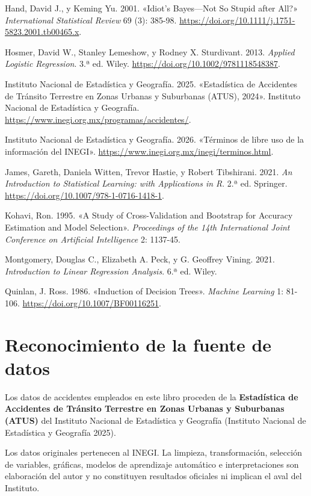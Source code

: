 \documentclass[
  spanish,
  10.5pt,
  letterpaper,
  openany,
  headings=big]{scrbook}
\newlength{\cslhangindent}
\newenvironment{CSLReferences}[2] %
 {\begin{list}{}{%
  \setlength{\itemindent}{0pt}
  \setlength{\leftmargin}{0pt}
  \setlength{\parsep}{0pt}
  \ifodd #1
   \setlength{\leftmargin}{\cslhangindent}
   \setlength{\itemindent}{-1\cslhangindent}
  \fi
  \setlength{\itemsep}{#2\baselineskip}}}
 {\end{list}}
\begin{document}
\begin{CSLReferences}{1}{1}
Hand, David J., y Keming Yu. 2001. {«Idiot's Bayes---Not So Stupid after
All?»} \emph{International Statistical Review} 69 (3): 385-98.
\url{https://doi.org/10.1111/j.1751-5823.2001.tb00465.x}.

Hosmer, David W., Stanley Lemeshow, y Rodney X. Sturdivant. 2013.
\emph{Applied Logistic Regression}. 3.ª ed. Wiley.
\url{https://doi.org/10.1002/9781118548387}.

Instituto Nacional de Estadística y Geografía. 2025. {«Estadística de
Accidentes de Tránsito Terrestre en Zonas Urbanas y Suburbanas (ATUS),
2024»}. Instituto Nacional de Estadística y Geografía.
\url{https://www.inegi.org.mx/programas/accidentes/}.

Instituto Nacional de Estadística y Geografía. 2026. {«Términos de libre
uso de la información del INEGI»}.
\url{https://www.inegi.org.mx/inegi/terminos.html}.

James, Gareth, Daniela Witten, Trevor Hastie, y Robert Tibshirani. 2021.
\emph{An Introduction to Statistical Learning: with Applications in R}.
2.ª ed. Springer. \url{https://doi.org/10.1007/978-1-0716-1418-1}.

Kohavi, Ron. 1995. {«A Study of Cross-Validation and Bootstrap for
Accuracy Estimation and Model Selection»}. \emph{Proceedings of the 14th
International Joint Conference on Artificial Intelligence} 2: 1137-45.

Montgomery, Douglas C., Elizabeth A. Peck, y G. Geoffrey Vining. 2021.
\emph{Introduction to Linear Regression Analysis}. 6.ª ed. Wiley.

Quinlan, J. Ross. 1986. {«Induction of Decision Trees»}. \emph{Machine
Learning} 1: 81-106. \url{https://doi.org/10.1007/BF00116251}.

\end{CSLReferences}

\section*{Reconocimiento de la fuente de
datos}\label{reconocimiento-de-la-fuente-de-datos}


Los datos de accidentes empleados en este libro proceden de la
\textbf{Estadística de Accidentes de Tránsito Terrestre en Zonas Urbanas
y Suburbanas (ATUS)} del Instituto Nacional de Estadística y Geografía
(Instituto Nacional de Estadística y Geografía 2025).

Los datos originales pertenecen al INEGI. La limpieza, transformación,
selección de variables, gráficas, modelos de aprendizaje automático e
interpretaciones son elaboración del autor y no constituyen resultados
oficiales ni implican el aval del Instituto.


\backmatter
\end{document}
